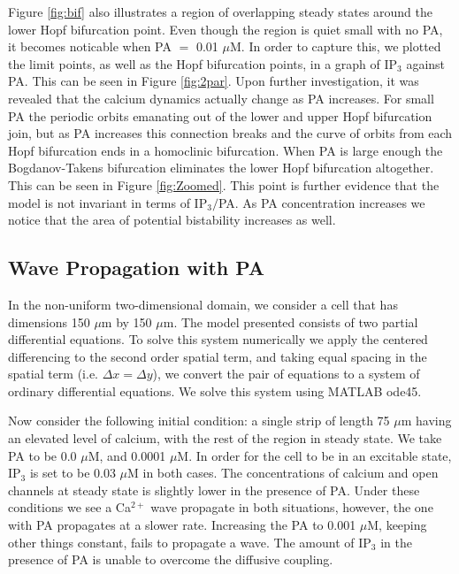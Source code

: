 \documentclass[preprint,12pt]{elsarticle}
\begin{document}
Figure \ref{fig:bif} also illustrates a region of overlapping steady states around the lower Hopf bifurcation point. Even though the region is quiet small with no PA, it becomes noticable when PA $=$ 0.01 $\mu$M. In order to capture this, we plotted the limit points, as well as the Hopf bifurcation points, in a graph of IP$_3$ against PA. This can be seen in Figure \ref{fig:2par}. Upon further investigation, it was revealed that the calcium dynamics actually change as PA increases. For small PA the periodic orbits emanating out of the lower and upper Hopf bifurcation join, but as PA increases this connection breaks and the curve of orbits from each Hopf bifurcation ends in a homoclinic bifurcation.  When PA is large enough the Bogdanov-Takens bifurcation eliminates the lower Hopf bifurcation altogether. This can be seen in Figure \ref{fig:Zoomed}. This point is further evidence that the model is not invariant in terms of IP$_3/$PA. As PA concentration increases we notice that the area of potential bistability increases as well.


\subsection{Wave Propagation with PA}
In the non-uniform two-dimensional domain, we consider a cell that has dimensions 150 $\mu$m by 150 $\mu$m. The model presented consists of two partial differential equations. To solve this system numerically we apply the centered differencing to the second order spatial term, and taking equal spacing in the spatial term (i.e. $\Delta x=\Delta y$), we convert the pair of equations to a system of ordinary differential equations. We solve this system using MATLAB ode45.

Now consider the following initial condition: a single strip of length 75 $\mu$m having an elevated level of calcium, with the rest of the region in steady state. We take PA to be 0.0 $\mu$M, and 0.0001 $\mu$M. In order for the cell to be in an excitable state, IP$_3$ is set to be 0.03 $\mu$M in both cases. The concentrations of calcium and open channels at steady state is slightly lower in the presence of PA. Under these conditions we see a Ca$^{2+}$ wave propagate in both situations, however, the one with PA propagates at a slower rate. Increasing the PA to 0.001 $\mu$M, keeping other things constant, fails to propagate a wave. The amount of IP$_3$ in the presence of PA is unable to overcome the diffusive coupling.
\end{document}
